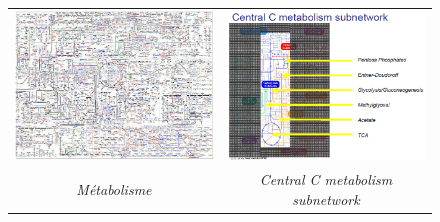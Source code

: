 \begin{figure}
    \centering
    \begin{tabular}{cc}
        \includegraphics[width =8 cm]{Images/1.PNG} & \includegraphics[width =8 cm]{Images/2.PNG} \\
        \textit{Métabolisme} & \textit{Central C metabolism subnetwork} \\

\end{tabular}
\end{figure}
